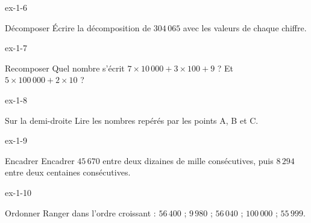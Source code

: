 \begin{blocLivre}{ex-1-6}\begin{exercice}[2]{Décomposer}
Écrire la décomposition de $304\,065$ avec les valeurs de chaque chiffre.
\end{exercice}\end{blocLivre}
\begin{blocLivre}{ex-1-7}\begin{exercice}[2]{Recomposer}
Quel nombre s’écrit $7\times10\,000+3\times100+9$ ? Et $5\times100\,000+2\times10$ ?
\end{exercice}\end{blocLivre}
\begin{blocLivre}{ex-1-8}\begin{exercice}[2]{Sur la demi-droite}
Lire les nombres repérés par les points A, B et C.
\label{fig-ex-1-8}
\end{exercice}\end{blocLivre}
\begin{blocLivre}{ex-1-9}\begin{exercice}[2]{Encadrer}
Encadrer $45\,670$ entre deux dizaines de mille consécutives, puis $8\,294$ entre deux centaines consécutives.
\end{exercice}\end{blocLivre}
\begin{blocLivre}{ex-1-10}\begin{exercice}[2]{Ordonner}
Ranger dans l’ordre croissant : $56\,400$ ; $9\,980$ ; $56\,040$ ; $100\,000$ ; $55\,999$.
\end{exercice}\end{blocLivre}

